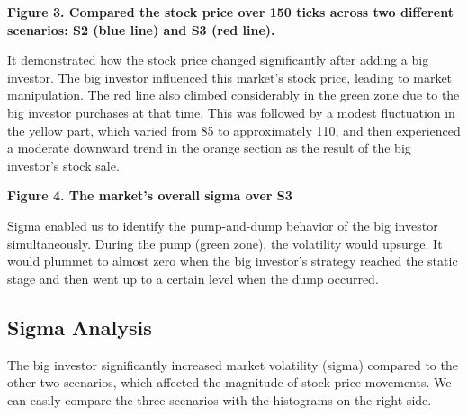 \documentclass[a4paper, 12pt]{article}
\begin{document}
\textbf{Figure 3. Compared the stock price over 150 ticks across two different scenarios: S2 (blue line) and S3 (red line).}\par
It demonstrated how the stock price changed significantly after adding a big investor. The big investor influenced this market's stock price, leading to market manipulation. The red line also climbed considerably in the green zone due to the big investor purchases at that time. This was followed by a modest fluctuation in the yellow part, which varied from 85 to approximately 110, and then experienced a moderate downward trend in the orange section as the result of the big investor's stock sale.\par

\vspace{\baselineskip}

\textbf{Figure 4. The market's overall sigma over S3}\par
Sigma enabled us to identify the pump-and-dump behavior of the big investor simultaneously. During the pump (green zone), the volatility would upsurge. It would plummet to almost zero when the big investor's strategy reached the static stage and then went up to a certain level when the dump occurred.\par

\subsection{Sigma Analysis}

The big investor significantly increased market volatility (sigma) compared to the other two scenarios, which affected the magnitude of stock price movements. We can easily compare the three scenarios with the histograms on the right side.\par
\end{document}
